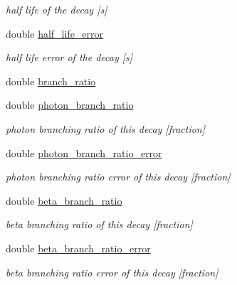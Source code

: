 \begin{DoxyCompactItemize}
\begin{DoxyCompactList}\small\item\em half life of the decay \mbox{[}s\mbox{]} \end{DoxyCompactList}\item 
\hypertarget{structpyne_1_1decay_a86b701ada7ee8d4a8fec95aedd711a87}{double \hyperlink{structpyne_1_1decay_a86b701ada7ee8d4a8fec95aedd711a87}{half\+\_\+life\+\_\+error}}\label{structpyne_1_1decay_a86b701ada7ee8d4a8fec95aedd711a87}

\begin{DoxyCompactList}\small\item\em half life error of the decay \mbox{[}s\mbox{]} \end{DoxyCompactList}\item 
double \hyperlink{structpyne_1_1decay_a21a58630e6aac8aa5517fb9d1bafe5d6}{branch\+\_\+ratio}
\item 
\hypertarget{structpyne_1_1decay_a7edc52996ae0705ac8c35fb6c437c3a8}{double \hyperlink{structpyne_1_1decay_a7edc52996ae0705ac8c35fb6c437c3a8}{photon\+\_\+branch\+\_\+ratio}}\label{structpyne_1_1decay_a7edc52996ae0705ac8c35fb6c437c3a8}

\begin{DoxyCompactList}\small\item\em photon branching ratio of this decay \mbox{[}fraction\mbox{]} \end{DoxyCompactList}\item 
\hypertarget{structpyne_1_1decay_a5492d786323042f5348897584065ec02}{double \hyperlink{structpyne_1_1decay_a5492d786323042f5348897584065ec02}{photon\+\_\+branch\+\_\+ratio\+\_\+error}}\label{structpyne_1_1decay_a5492d786323042f5348897584065ec02}

\begin{DoxyCompactList}\small\item\em photon branching ratio error of this decay \mbox{[}fraction\mbox{]} \end{DoxyCompactList}\item 
\hypertarget{structpyne_1_1decay_a566b715c5e41239f2c178880ae3dc3c5}{double \hyperlink{structpyne_1_1decay_a566b715c5e41239f2c178880ae3dc3c5}{beta\+\_\+branch\+\_\+ratio}}\label{structpyne_1_1decay_a566b715c5e41239f2c178880ae3dc3c5}

\begin{DoxyCompactList}\small\item\em beta branching ratio of this decay \mbox{[}fraction\mbox{]} \end{DoxyCompactList}\item 
\hypertarget{structpyne_1_1decay_afe2d8be6a39ee1dd7045a1970451f04e}{double \hyperlink{structpyne_1_1decay_afe2d8be6a39ee1dd7045a1970451f04e}{beta\+\_\+branch\+\_\+ratio\+\_\+error}}\label{structpyne_1_1decay_afe2d8be6a39ee1dd7045a1970451f04e}

\begin{DoxyCompactList}\small\item\em beta branching ratio error of this decay \mbox{[}fraction\mbox{]} \end{DoxyCompactList}\end{DoxyCompactItemize}


